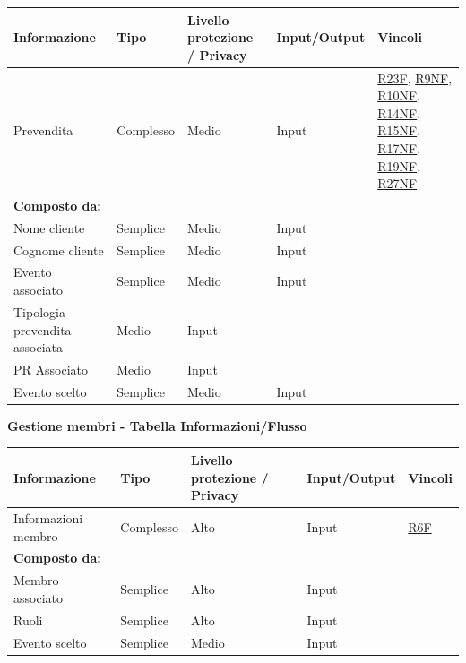 \documentclass[a4paper]{article}
\begin{document}
\begin{center}
    \begin{tabularx}{1\textwidth}{|X|l|X|X|X|}
        \hline
        \textbf{Informazione} &\textbf{Tipo} & \textbf{Livello protezione / Privacy} & \textbf{Input/Output} & \textbf{Vincoli}\\
        \hline
        \hline
        Prevendita & Complesso & Medio & Input & \hyperlink{R23F}{R23F}, \hyperlink{R9NF}{R9NF}, \hyperlink{R10NF}{R10NF}, \hyperlink{R14NF}{R14NF}, \hyperlink{R15NF}{R15NF}, \hyperlink{R17NF}{R17NF}, \hyperlink{R19NF}{R19NF}, \hyperlink{R27NF}{R27NF} \\
        \textbf{Composto da:} & & & & \\
        Nome cliente & Semplice & Medio & Input & \\
        Cognome cliente & Semplice & Medio & Input & \\
        Evento associato & Semplice & Medio & Input & \\
        Tipologia prevendita associata & Medio & Input & \\
        PR Associato & Medio & Input & \\
        \hline
        Evento scelto & Semplice & Medio & Input & \\
        \hline
    \end{tabularx}
\end{center}

\textbf{Gestione membri  - Tabella Informazioni/Flusso}

\begin{center}
    \begin{tabularx}{1\textwidth}{|X|l|X|X|X|}
        \hline
        \textbf{Informazione} &\textbf{Tipo} & \textbf{Livello protezione / Privacy} & \textbf{Input/Output} & \textbf{Vincoli}\\
        \hline
        \hline
        Informazioni membro & Complesso & Alto & Input & \hyperlink{R6F}{R6F}\\
        \textbf{Composto da:} & & & & \\
        Membro associato & Semplice & Alto & Input & \\
        Ruoli & Semplice & Alto & Input & \\
        \hline
        Evento scelto & Semplice & Medio & Input & \\
        \hline
    \end{tabularx}
\end{center}
\end{document}
